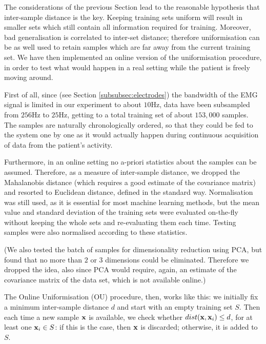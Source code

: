 The considerations of the previous Section lead to the reasonable
hypothesis that inter-sample distance is the key. Keeping training
sets uniform will result in smaller sets which still contain all
information required for training. Moreover, bad generalisation is
correlated to inter-set distance; therefore uniformisation can be as
well used to retain samples which are far away from the current
training set. We have then implemented an online version of the
uniformisation procedure, in order to test what would happen in a real
setting while the patient is freely moving around.

First of all, since (see Section \ref{subsubsec:electrodes}) the
bandwidth of the EMG signal is limited in our experiment to about
$10$Hz, data have been subsampled from $256$Hz to $25$Hz, getting to a
total training set of about $153,000$ samples. The samples are
naturally chronologically ordered, so that they could be fed to the
system one by one as it would actually happen during continuous
acquisition of data from the patient's activity.

Furthermore, in an online setting no a-priori statistics about the
samples can be assumed. Therefore, as a measure of inter-sample
distance, we dropped the Mahalanobis distance (which requires a good
estimate of the covariance matrix) and resorted to Euclidean distance,
defined in the standard way. Normalisation was still used, as it is
essential for most machine learning methods, but the mean value and
standard deviation of the training sets were evaluated on-the-fly
without keeping the whole sets and re-evaluating them each
time. Testing samples were also normalised according to these
statistics.

(We also tested the batch of samples for dimensionality reduction using
PCA, but found that no more than $2$ or $3$ dimensions could be
eliminated. Therefore we dropped the idea, also since PCA would
require, again, an estimate of the covariance matrix of the data set,
which is not available online.)

The Online Uniformisation (OU) procedure, then, works like this: we
initially fix a minimum inter-sample distance $d$ and start
with an empty training set $S$. Then each time a new sample $\mathbf{x}$ is
available, we check whether $dist(\mathbf{x},\mathbf{x}_i)\leq d$, for at
least one $\mathbf{x}_i \in S$: if this is the case, then $\mathbf{x}$ is discarded;
otherwise, it is added to $S$.

